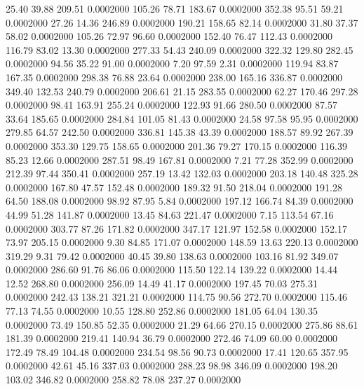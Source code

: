   25.40   39.88  209.51   0.0002000
 105.26   78.71  183.67   0.0002000
 352.38   95.51   59.21   0.0002000
  27.26   14.36  246.89   0.0002000
 190.21  158.65   82.14   0.0002000
  31.80   37.37   58.02   0.0002000
 105.26   72.97   96.60   0.0002000
 152.40   76.47  112.43   0.0002000
 116.79   83.02   13.30   0.0002000
 277.33   54.43  240.09   0.0002000
 322.32  129.80  282.45   0.0002000
  94.56   35.22   91.00   0.0002000
   7.20   97.59    2.31   0.0002000
 119.94   83.87  167.35   0.0002000
 298.38   76.88   23.64   0.0002000
 238.00  165.16  336.87   0.0002000
 349.40  132.53  240.79   0.0002000
 206.61   21.15  283.55   0.0002000
  62.27  170.46  297.28   0.0002000
  98.41  163.91  255.24   0.0002000
 122.93   91.66  280.50   0.0002000
  87.57   33.64  185.65   0.0002000
 284.84  101.05   81.43   0.0002000
  24.58   97.58   95.95   0.0002000
 279.85   64.57  242.50   0.0002000
 336.81  145.38   43.39   0.0002000
 188.57   89.92  267.39   0.0002000
 353.30  129.75  158.65   0.0002000
 201.36   79.27  170.15   0.0002000
 116.39   85.23   12.66   0.0002000
 287.51   98.49  167.81   0.0002000
   7.21   77.28  352.99   0.0002000
 212.39   97.44  350.41   0.0002000
 257.19   13.42  132.03   0.0002000
 203.18  140.48  325.28   0.0002000
 167.80   47.57  152.48   0.0002000
 189.32   91.50  218.04   0.0002000
 191.28   64.50  188.08   0.0002000
  98.92   87.95    5.84   0.0002000
 197.12  166.74   84.39   0.0002000
  44.99   51.28  141.87   0.0002000
  13.45   84.63  221.47   0.0002000
   7.15  113.54   67.16   0.0002000
 303.77   87.26  171.82   0.0002000
 347.17  121.97  152.58   0.0002000
 152.17   73.97  205.15   0.0002000
   9.30   84.85  171.07   0.0002000
 148.59   13.63  220.13   0.0002000
 319.29    9.31   79.42   0.0002000
  40.45   39.80  138.63   0.0002000
 103.16   81.92  349.07   0.0002000
 286.60   91.76   86.06   0.0002000
 115.50  122.14  139.22   0.0002000
  14.44   12.52  268.80   0.0002000
 256.09   14.49   41.17   0.0002000
 197.45   70.03  275.31   0.0002000
 242.43  138.21  321.21   0.0002000
 114.75   90.56  272.70   0.0002000
 115.46   77.13   74.55   0.0002000
  10.55  128.80  252.86   0.0002000
 181.05   64.04  130.35   0.0002000
  73.49  150.85   52.35   0.0002000
  21.29   64.66  270.15   0.0002000
 275.86   88.61  181.39   0.0002000
 219.41  140.94   36.79   0.0002000
 272.46   74.09   60.00   0.0002000
 172.49   78.49  104.48   0.0002000
 234.54   98.56   90.73   0.0002000
  17.41  120.65  357.95   0.0002000
  42.61   45.16  337.03   0.0002000
 288.23   98.98  346.09   0.0002000
 198.20  103.02  346.82   0.0002000
 258.82   78.08  237.27   0.0002000
